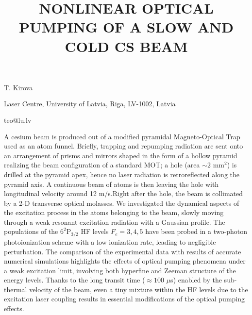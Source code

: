 \title{NONLINEAR OPTICAL PUMPING OF A SLOW AND COLD CS BEAM}

\underline{T. Kirova}

{\normalsize{\vspace{-4mm}
Laser Centre,
University of Latvia,
Riga, LV-1002,
Latvia

\email teo@lu.lv}}

A cesium beam is produced out of a modified pyramidal Magneto-Optical Trap used as an atom
funnel. Briefly, trapping and repumping radiation are sent onto an arrangement of prisms and mirrors
shaped in the form of a hollow pyramid realizing the beam configuration of a standard MOT; a
hole (area $\sim 2$ mm$^2$) is drilled at the pyramid apex, hence no laser radiation is
retroreflected along the pyramid axis. A continuous beam of atoms is then leaving the hole with
longitudinal velocity around 12 m/s.Right after the hole, the beam is collimated by a 2-D transverse
optical molasses.  We investigated the dynamical aspects of the excitation process in the atoms
belonging to the beam, slowly moving through a weak resonant excitation radiation with a Gaussian
profile. The populations of the $6^{2}\mathrm{P}_{3/2}$ HF levels $F_{e}=3, 4, 5$ have been probed
in a two-photon photoionization scheme with  a low ionization rate, leading to negligible
perturbation. The comparison of the experimental data with results of accurate numerical
simulations highlights the effects of optical pumping phenomena under a weak excitation limit,
involving both hyperfine and Zeeman structure of the energy levels. Thanks to the long transit time
($\approx 100$ $\mu$s) enabled by the sub-thermal velocity of the beam, even a tiny mixture
within the HF levels due to the excitation laser coupling results in essential modifications of the
optical pumping effects.

\vspace{\baselineskip}

